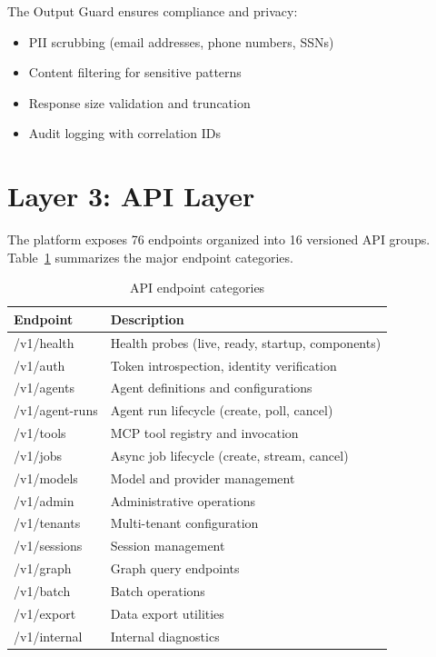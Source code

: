 \documentclass[a4paper,twoside]{sapthesis}
\begin{document}
The Output Guard ensures compliance and privacy:

\begin{itemize}
    \item PII scrubbing (email addresses, phone numbers, SSNs)
    \item Content filtering for sensitive patterns
    \item Response size validation and truncation
    \item Audit logging with correlation IDs
\end{itemize}

\section{Layer 3: API Layer}
\label{sec:layer3-api}

The platform exposes 76 endpoints organized into 16 versioned API groups. Table~\ref{tab:api-endpoints} summarizes the major endpoint categories.

\begin{table}[htbp]
\centering
\caption{API endpoint categories}
\label{tab:api-endpoints}
\begin{tabular}{@{}ll@{}}
\toprule
\textbf{Endpoint} & \textbf{Description} \\
\midrule
/v1/health & Health probes (live, ready, startup, components) \\
/v1/auth & Token introspection, identity verification \\
/v1/agents & Agent definitions and configurations \\
/v1/agent-runs & Agent run lifecycle (create, poll, cancel) \\
/v1/tools & MCP tool registry and invocation \\
/v1/jobs & Async job lifecycle (create, stream, cancel) \\
/v1/models & Model and provider management \\
/v1/admin & Administrative operations \\
/v1/tenants & Multi-tenant configuration \\
/v1/sessions & Session management \\
/v1/graph & Graph query endpoints \\
/v1/batch & Batch operations \\
/v1/export & Data export utilities \\
/v1/internal & Internal diagnostics \\
\bottomrule
\end{tabular}
\end{table}
\end{document}
